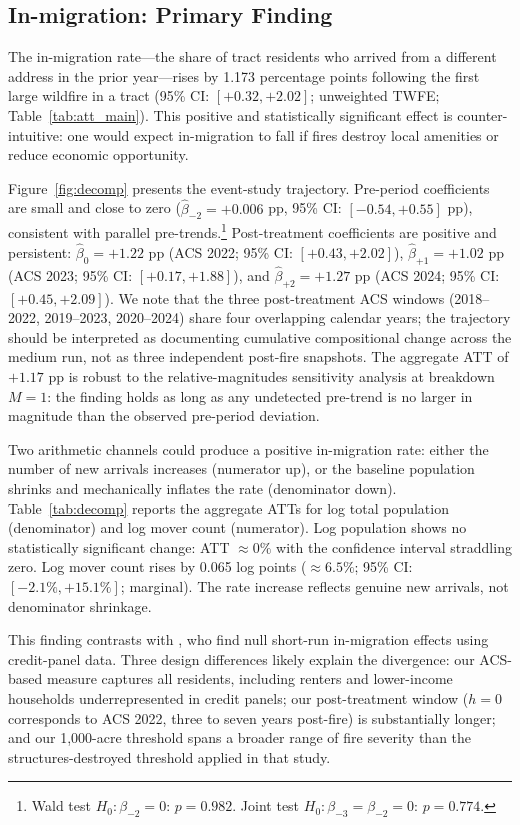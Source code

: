 \documentclass[12pt]{article}
\begin{document}
\subsection{In-migration: Primary Finding}

The in-migration rate---the share of tract residents who arrived from
a different address in the prior year---rises by 1.173 percentage points
following the first large wildfire in a tract
(95\% CI: $[+0.32, +2.02]$; unweighted TWFE; Table~\ref{tab:att_main}).
This positive and statistically significant effect is counter-intuitive:
one would expect in-migration to fall if fires destroy local amenities
or reduce economic opportunity.

Figure~\ref{fig:decomp} presents the event-study trajectory.
Pre-period coefficients are small and close to zero
($\hat{\beta}_{-2} = +0.006$ pp, 95\% CI: $[-0.54, +0.55]$ pp),
consistent with parallel pre-trends.\footnote{%
  Wald test $H_0 \colon \beta_{-2} = 0$: $p = 0.982$.
  Joint test $H_0 \colon \beta_{-3} = \beta_{-2} = 0$: $p = 0.774$.}
Post-treatment coefficients are positive and persistent:
$\hat{\beta}_0 = +1.22$ pp (ACS 2022; 95\% CI: $[+0.43, +2.02]$),
$\hat{\beta}_{+1} = +1.02$ pp (ACS 2023; 95\% CI: $[+0.17, +1.88]$),
and $\hat{\beta}_{+2} = +1.27$ pp (ACS 2024; 95\% CI: $[+0.45, +2.09]$).
We note that the three post-treatment ACS windows (2018--2022,
2019--2023, 2020--2024) share four overlapping calendar years;
the trajectory should be interpreted as documenting cumulative
compositional change across the medium run, not as three
independent post-fire snapshots.
The aggregate ATT of $+1.17$ pp is robust to the
\citet{rambachan2023more} relative-magnitudes sensitivity analysis
at breakdown $M = 1$: the finding holds as long as any undetected
pre-trend is no larger in magnitude than the observed
pre-period deviation.

Two arithmetic channels could produce a positive in-migration rate:
either the number of new arrivals increases (numerator up),
or the baseline population shrinks and mechanically inflates the rate
(denominator down).
Table~\ref{tab:decomp} reports the aggregate ATTs for log total population
(denominator) and log mover count (numerator).
Log population shows no statistically significant change:
ATT $\approx 0\%$ with the confidence interval straddling zero.
Log mover count rises by 0.065 log points
($\approx 6.5\%$; 95\% CI: $[-2.1\%, +15.1\%]$; marginal).
The rate increase reflects genuine new arrivals, not denominator shrinkage.

This finding contrasts with \citet{mcconnell2024wildfire}, who find
null short-run in-migration effects using credit-panel data.
Three design differences likely explain the divergence:
our ACS-based measure captures all residents, including renters and
lower-income households underrepresented in credit panels;
our post-treatment window ($h = 0$ corresponds to ACS 2022,
three to seven years post-fire) is substantially longer;
and our 1,000-acre threshold spans a broader range of fire severity
than the structures-destroyed threshold applied in that study.
\end{document}
